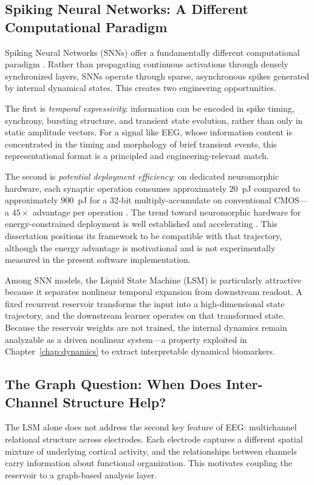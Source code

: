 \subsection{Spiking Neural Networks: A Different Computational Paradigm}

Spiking Neural Networks (SNNs) offer a fundamentally different computational paradigm \cite{maass_networks_1997}. Rather than propagating continuous activations through densely synchronized layers, SNNs operate through sparse, asynchronous spikes generated by internal dynamical states. This creates two engineering opportunities.

The first is \emph{temporal expressivity}: information can be encoded in spike timing, synchrony, bursting structure, and transient state evolution, rather than only in static amplitude vectors. For a signal like EEG, whose information content is concentrated in the timing and morphology of brief transient events, this representational format is a principled and engineering-relevant match.

The second is \emph{potential deployment efficiency}: on dedicated neuromorphic hardware, each synaptic operation consumes approximately $20$~pJ compared to approximately $900$~pJ for a 32-bit multiply-accumulate on conventional CMOS---a $45\times$ advantage per operation \cite{davies2018loihi}. The trend toward neuromorphic hardware for energy-constrained deployment is well established and accelerating \cite{schuman2022neuromorphic}. This dissertation positions its framework to be compatible with that trajectory, although the energy advantage is motivational and is not experimentally measured in the present software implementation.

Among SNN models, the Liquid State Machine (LSM) is particularly attractive because it separates nonlinear temporal expansion from downstream readout. A fixed recurrent reservoir transforms the input into a high-dimensional state trajectory, and the downstream learner operates on that transformed state. Because the reservoir weights are not trained, the internal dynamics remain analyzable as a driven nonlinear system---a property exploited in Chapter~\ref{chap:dynamics} to extract interpretable dynamical biomarkers.

\subsection{The Graph Question: When Does Inter-Channel Structure Help?}

The LSM alone does not address the second key feature of EEG: multichannel relational structure across electrodes. Each electrode captures a different spatial mixture of underlying cortical activity, and the relationships between channels carry information about functional organization. This motivates coupling the reservoir to a graph-based analysis layer.

